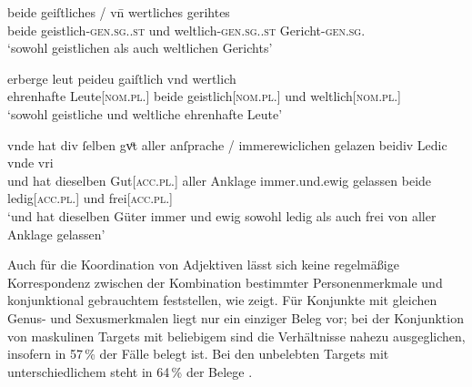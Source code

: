 \begin{exe}
\ex \label{ex:caobeidkoordtarg}
	\begin{xlist}
	\ex \label{ex:caobeidkoordtarg_1}
		\gll beide geiſtliches / vn̄ wertliches gerihtes \\
			beide geistlich-\textsc{gen.sg.\NeutI.st} {} und
			weltlich-\textsc{gen.sg.\NeutI.st} Gericht-\textsc{gen.sg.\NeutI} \\
		\trans `sowohl geistlichen als auch weltlichen Gerichts'
			\parencites(Nr.~1764, Bamberg, 1293)[71,26]{cao3}

	\ex \label{ex:caobeidkoordtarg_2}
		\gll erberge leut peideu gaiſtlich vnd wertlich \\
			ehrenhafte Leute[\textsc{nom.pl.\MascA}] beide geistlich[\textsc{nom.pl.\MascA}]
			und weltlich[\textsc{nom.pl.\MascA}] \\
		\trans `sowohl geistliche und weltliche ehrenhafte Leute'
			\parencites(Nr.~1153, Engelthal, Kr.~Nürnberger Land, 1289)[431,44]{cao2}

	\ex \label{ex:caobeidkoordtarg_3}
		\gll vnde hat {div ſelben} gvͦt \textelp{} aller anſprache /
			immerewiclichen gelazen beidiv Ledic vnde vri \\
			und hat dieselben Gut[\textsc{acc.pl.\NeutI}] {} aller Anklage {}
			immer.und.ewig gelassen beide ledig[\textsc{acc.pl.\NeutI}] und
			frei[\textsc{acc.pl.\NeutI}] \\
		\trans `und hat dieselben Güter \textelp{} immer und ewig sowohl
			ledig als auch frei von aller Anklage gelassen'
			\parencites(Nr.~2293, Bamberg, 1295)[420,21--23]{cao3}
	\end{xlist}
\end{exe}

Auch für die Koordination von Adjektiven lässt sich keine regelmäßige
Korrespondenz zwischen der Kombination bestimmter
Personenmerkmale und konjunktional gebrauchtem 
feststellen, wie  zeigt. Für Konjunkte mit gleichen
Genus- und Sexusmerkmalen liegt nur ein
einziger Beleg vor; bei der Konjunktion von maskulinen Targets mit beliebigem
 sind die Verhältnisse nahezu ausgeglichen, insofern in 57\,\% der
Fälle  belegt ist. Bei den unbelebten Targets mit
unterschiedlichem  steht in 64\,\% der Belege .

